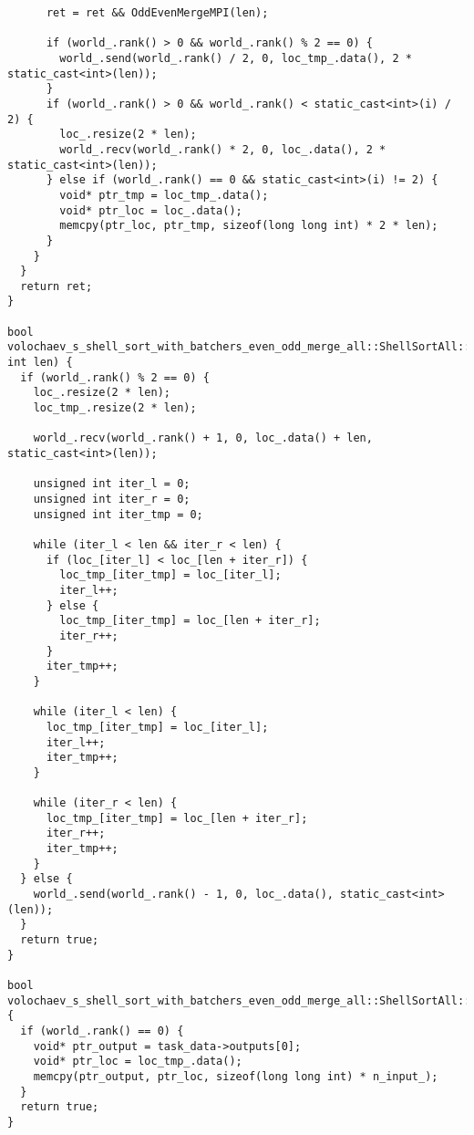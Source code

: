 \documentclass[12pt]{article}
\begin{document}
\begin{lstlisting}
      ret = ret && OddEvenMergeMPI(len);

      if (world_.rank() > 0 && world_.rank() % 2 == 0) {
        world_.send(world_.rank() / 2, 0, loc_tmp_.data(), 2 * static_cast<int>(len));
      }
      if (world_.rank() > 0 && world_.rank() < static_cast<int>(i) / 2) {
        loc_.resize(2 * len);
        world_.recv(world_.rank() * 2, 0, loc_.data(), 2 * static_cast<int>(len));
      } else if (world_.rank() == 0 && static_cast<int>(i) != 2) {
        void* ptr_tmp = loc_tmp_.data();
        void* ptr_loc = loc_.data();
        memcpy(ptr_loc, ptr_tmp, sizeof(long long int) * 2 * len);
      }
    }
  }
  return ret;
}

bool volochaev_s_shell_sort_with_batchers_even_odd_merge_all::ShellSortAll::OddEvenMergeMPI(unsigned int len) {
  if (world_.rank() % 2 == 0) {
    loc_.resize(2 * len);
    loc_tmp_.resize(2 * len);

    world_.recv(world_.rank() + 1, 0, loc_.data() + len, static_cast<int>(len));

    unsigned int iter_l = 0;
    unsigned int iter_r = 0;
    unsigned int iter_tmp = 0;

    while (iter_l < len && iter_r < len) {
      if (loc_[iter_l] < loc_[len + iter_r]) {
        loc_tmp_[iter_tmp] = loc_[iter_l];
        iter_l++;
      } else {
        loc_tmp_[iter_tmp] = loc_[len + iter_r];
        iter_r++;
      }
      iter_tmp++;
    }

    while (iter_l < len) {
      loc_tmp_[iter_tmp] = loc_[iter_l];
      iter_l++;
      iter_tmp++;
    }

    while (iter_r < len) {
      loc_tmp_[iter_tmp] = loc_[len + iter_r];
      iter_r++;
      iter_tmp++;
    }
  } else {
    world_.send(world_.rank() - 1, 0, loc_.data(), static_cast<int>(len));
  }
  return true;
}

bool volochaev_s_shell_sort_with_batchers_even_odd_merge_all::ShellSortAll::PostProcessingImpl() {
  if (world_.rank() == 0) {
    void* ptr_output = task_data->outputs[0];
    void* ptr_loc = loc_tmp_.data();
    memcpy(ptr_output, ptr_loc, sizeof(long long int) * n_input_);
  }
  return true;
}
\end{lstlisting}
\end{document}

